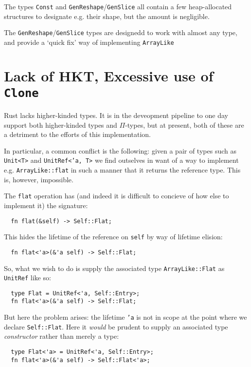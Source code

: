 \documentclass{DIKU-report-variant}
\begin{document}
The types \texttt{Const} and \texttt{GenReshape}/\texttt{GenSlice} all contain a few heap-allocated
structures to designate e.g. their shape, but the amount is negligible.

The \texttt{GenReshape}/\texttt{GenSlice} types are designedd to work with almost any type, and
provide a `quick fix' way of implementing \texttt{ArrayLike}

\section{Lack of HKT, Excessive use of \texttt{Clone}}

Rust lacks higher-kinded types. It is in the deveopment pipeline to one day support both higher-kinded
types and \(\Pi\)-types, but at present, both of these are a detriment to the efforts of this implementation.

In particular, a common conflict is the following: given a pair of types such as \texttt{Unit<T>} and
\texttt{UnitRef<'a, T>} we find outselves in want of a way to implement e.g. \texttt{ArrayLike::flat}
in such a manner that it returns the reference type. This is, however, impossible.

The \texttt{flat} operation has (and indeed it is difficult to concieve of how else to implement it) the
signature:

\begin{lstlisting}
  fn flat(&self) -> Self::Flat;
\end{lstlisting}

This hides the lifetime of the reference on \texttt{self} by way of lifetime elision:

\begin{lstlisting}
  fn flat<'a>(&'a self) -> Self::Flat;
\end{lstlisting}

So, what we wish to do is supply the associated type \texttt{ArrayLike::Flat} as \texttt{UnitRef} like
so:

\begin{lstlisting}
  type Flat = UnitRef<'a, Self::Entry>;
  fn flat<'a>(&'a self) -> Self::Flat;
\end{lstlisting}

But here the problem arises: the lifetime \texttt{'a} is not in scope at the point where we declare
\texttt{Self::Flat}. Here it \emph{would} be prudent to supply an associated type \emph{constructor}
rather than merely a type:

\begin{lstlisting}
  type Flat<'a> = UnitRef<'a, Self::Entry>;
  fn flat<'a>(&'a self) -> Self::Flat<'a>;
\end{lstlisting}
\end{document}
